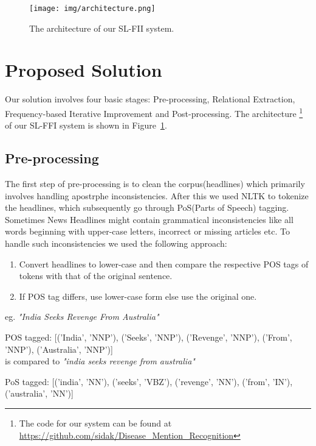 \documentclass{article}
\begin{document}
\begin{figure}[t]
\centering
\texttt{[image: img/architecture.png]}
\caption{The architecture of our SL-FII system.}
\label{fig:architecture}
\end{figure}


\section{Proposed Solution}

Our solution involves four basic stages: Pre-processing, Relational Extraction, Frequency-based Iterative Improvement and Post-processing. The architecture \footnote{The code for our system can be found at \\ \url{https://github.com/sidak/Disease_Mention_Recognition}} of our SL-FFI system is shown in Figure~\ref{fig:architecture}. 

\subsection{Pre-processing}

The first step of pre-processing is to clean the corpus(headlines) which primarily involves handling apostrphe inconsistencies. After this we used NLTK to tokenize the headlines, which subsequently go through PoS(Parts of Speech) tagging. Sometimes News Headlines might contain grammatical inconsistencies like all words beginning with upper-case letters, incorrect or missing articles etc.  To handle such inconsistencies we used the following approach:
\begin{enumerate}

\item Convert headlines to lower-case and then compare the respective POS tags of tokens with that of the original sentence.

\item If POS tag differs, use lower-case form else use the original one.
\end{enumerate}

eg. \textit{"India Seeks Revenge From Australia"}

POS tagged: [('India', 'NNP'), ('Seeks', 'NNP'), ('Revenge', 'NNP'), ('From', 'NNP'), ('Australia', 'NNP')]\\

is compared to \textit{"india seeks revenge from australia"}

PoS tagged: [('india', 'NN'), ('seeks', 'VBZ'), ('revenge', 'NN'), ('from', 'IN'), ('australia', 'NN')]\\
\end{document}
